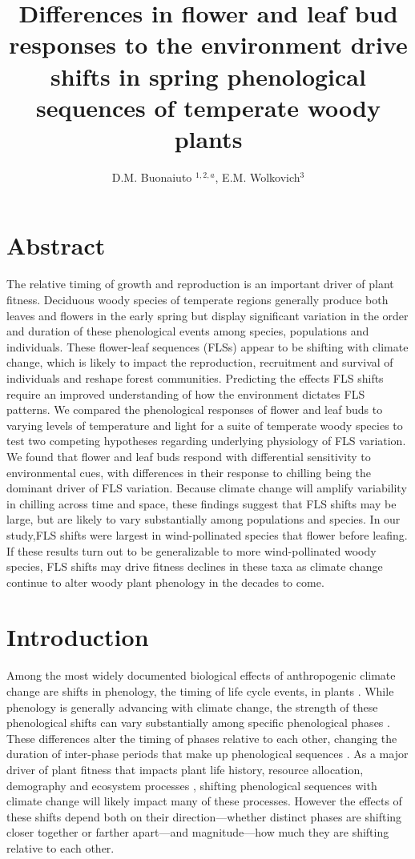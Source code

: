 \documentclass[11pt]{article}\usepackage[]{graphicx}\usepackage[]{color}
\title{Differences in flower and leaf bud responses to the environment drive shifts in spring phenological sequences of temperate woody plants}\\%
\date{}
\author{D.M. Buonaiuto $^{1,2,a}$, E.M. Wolkovich$^{3}$}
\begin{document}
\maketitle
\section*{Abstract} 
The relative timing of growth and reproduction is an important driver of plant fitness. Deciduous woody species of temperate regions generally produce both leaves and flowers in the early spring but display significant variation in the order and duration of these phenological events among species, populations and individuals. These flower-leaf sequences (FLSs) appear to be shifting with climate change, which is likely to impact the reproduction, recruitment and survival of individuals and reshape forest communities. Predicting the effects FLS shifts require an improved understanding of how the environment dictates FLS patterns. We compared the phenological responses of flower and leaf buds to varying levels of temperature and light for a suite of temperate woody species to test two competing hypotheses regarding underlying physiology of FLS variation. We found that flower and leaf buds respond with differential sensitivity to environmental cues, with differences in their response to chilling being the dominant driver of FLS variation. Because climate change will amplify variability in chilling across time and space, these findings suggest that FLS shifts may be large, but are likely to vary substantially among populations and species. In our study,FLS shifts were largest in wind-pollinated species that flower before leafing. If these results turn out to be generalizable to more wind-pollinated woody species, FLS shifts may drive fitness declines in these taxa as climate change continue to alter woody plant phenology in the decades to come.   

\section*{Introduction}
\noindent Among the most widely documented biological effects of anthropogenic climate change are shifts in phenology, the timing of life cycle events, in plants \citep{Parmesan2003,Menzel2006,Cleland2007}. While phenology is generally advancing with climate change, the strength of these phenological shifts can vary substantially among specific phenological phases \citep{Augspurger:2020aa}. These differences alter the timing of phases relative to each other, changing the duration of inter-phase periods that make up phenological sequences \citep{Ettinger2018}. As a major driver of plant fitness that impacts plant life history, resource allocation, demography and ecosystem processes \citep{Post:2008aa}, shifting phenological sequences with climate change will likely impact many of these processes. However the effects of these shifts depend both on their direction---whether distinct phases are shifting closer together or farther apart---and magnitude---how much they are shifting relative to each other.\\ 
\end{document}
